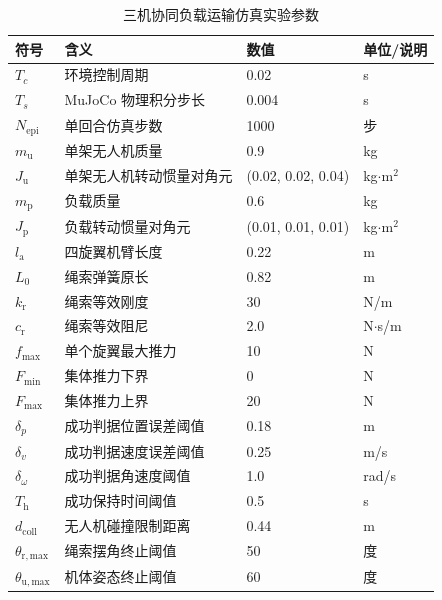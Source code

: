 \begin{table}[htbp]
    \centering
    \caption{三机协同负载运输仿真实验参数}
    \label{tab:triquad_sim_setup}
    \renewcommand{\arraystretch}{1.15}
    \begin{tabular}{p{}p{}p{}p{}}
        \toprule
        符号 & 含义 & 数值 & 单位/说明 \\
        \midrule
        $T_c$ & 环境控制周期 & 0.02 & s \\
        $T_s$ & MuJoCo 物理积分步长 & 0.004 & s \\
        $N_{\mathrm{epi}}$ & 单回合仿真步数 & 1000 & 步 \\
        $m_{\mathrm{u}}$ & 单架无人机质量 & 0.9 & kg \\
        $J_{\mathrm{u}}$ & 单架无人机转动惯量对角元 & (0.02, 0.02, 0.04) & kg$\cdot$m$^2$ \\
        $m_{\mathrm{p}}$ & 负载质量 & 0.6 & kg \\
        $J_{\mathrm{p}}$ & 负载转动惯量对角元 & (0.01, 0.01, 0.01) & kg$\cdot$m$^2$ \\
        $l_{\mathrm{a}}$ & 四旋翼机臂长度 & 0.22 & m \\
        $L_0$ & 绳索弹簧原长 & 0.82 & m \\
        $k_{\mathrm{r}}$ & 绳索等效刚度 & 30 & N/m \\
        $c_{\mathrm{r}}$ & 绳索等效阻尼 & 2.0 & N$\cdot$s/m \\
        $f_{\max}$ & 单个旋翼最大推力 & 10 & N \\
        $F_{\min}$ & 集体推力下界 & 0 & N \\
        $F_{\max}$ & 集体推力上界 & 20 & N \\
        $\delta_p$ & 成功判据位置误差阈值 & 0.18 & m \\
        $\delta_v$ & 成功判据速度误差阈值 & 0.25 & m/s \\
        $\delta_{\omega}$ & 成功判据角速度阈值 & 1.0 & rad/s \\
        $T_{\mathrm{h}}$ & 成功保持时间阈值 & 0.5 & s \\
        $d_{\mathrm{coll}}$ & 无人机碰撞限制距离 & 0.44 & m\\
        $\theta_{\mathrm{r,max}}$ & 绳索摆角终止阈值 & 50 & 度 \\
        $\theta_{\mathrm{u,max}}$ & 机体姿态终止阈值 & 60 & 度 \\
        \bottomrule
    \end{tabular}
\end{table}

